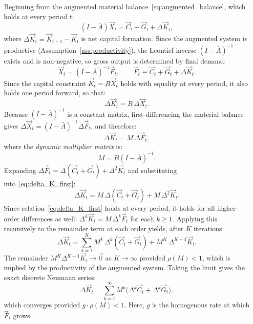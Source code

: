 Beginning from the augmented material balance~\eqref{eq:augmented_balance},
which holds at every period $t$:
%
\begin{equation}
    (I - \bar{A})\vec{X}_{t} = \vec{C}_{t} + \vec{G}_{t} + \Delta\vec{K}_{t},
\end{equation}
%
where $\Delta\vec{K}_{t} = \vec{K}_{t+1} - \vec{K}_{t}$ is net capital
formation. Since the augmented system is productive
(Assumption~\ref{ass:productivity}), the Leontief inverse
$(I - \bar{A})^{-1}$ exists and is non-negative, so gross output is
determined by final demand:
%
\begin{equation}
    \vec{X}_{t} = (I - \bar{A})^{-1} \vec{F}_{t},
    \qquad
    \vec{F}_{t} \equiv \vec{C}_{t} + \vec{G}_{t} + \Delta\vec{K}_{t}.
\end{equation}
%
Since the capital constraint $\vec{K}_{t} = B\vec{X}_{t}$ holds with
equality at every period, it also holds one period forward, so that:
%
\begin{equation}
    \Delta\vec{K}_{t} = B\,\Delta\vec{X}_{t}.
\end{equation}
%
Because $(I - \bar{A})^{-1}$ is a constant matrix, first-differencing
the material balance gives $\Delta\vec{X}_{t} = (I-\bar{A})^{-1}
\Delta\vec{F}_{t}$, and therefore:
%
\begin{equation}\label{eq:delta_K_first}
    \Delta\vec{K}_{t} = M\,\Delta\vec{F}_{t},
\end{equation}
%
where the \emph{dynamic multiplier matrix} is:
%
\begin{equation}\label{eq:multiplier}
    M = B(I - \bar{A})^{-1}.
\end{equation}
%
Expanding $\Delta\vec{F}_{t} = \Delta(\vec{C}_{t} + \vec{G}_{t}) +
\Delta^{2}\vec{K}_{t}$ and substituting into~\eqref{eq:delta_K_first}:
%
\begin{equation}
    \Delta\vec{K}_{t}
    = M\,\Delta(\vec{C}_{t} + \vec{G}_{t})
    + M\,\Delta^{2}\vec{K}_{t}.
\end{equation}
%
Since relation~\eqref{eq:delta_K_first} holds at every period, it
holds for all higher-order differences as well:
$\Delta^{k}\vec{K}_{t} = M\,\Delta^{k}\vec{F}_{t}$ for each
$k \geq 1$. Applying this recursively to the remainder term at each
order yields, after $K$ iterations:
%
\begin{equation}
    \Delta\vec{K}_{t}
    = \sum_{k=1}^{K} M^{k}\,\Delta^{k}(\vec{C}_{t} + \vec{G}_{t})
    + M^{K}\,\Delta^{K+1}\vec{K}_{t}.
\end{equation}
%
The remainder $M^{K}\Delta^{K+1}\vec{K}_{t} \to \vec{0}$ as
$K\to\infty$ provided $\rho(M) < 1$, which is implied by the
productivity of the augmented system. Taking the limit gives the
exact discrete Neumann series:
%
\begin{equation}\label{eq:finite_difference}
\boxed{
    \Delta\vec{K}_{t}
    = \sum_{k=1}^{\infty} M^{k}
    \bigl(\Delta^{k}\vec{C}_{t} + \Delta^{k}\vec{G}_{t}\bigr),}
\end{equation}
%
which converges provided $g \cdot \rho(M) < 1$. Here, $g$ is the homogenous rate at which $\vec{F}_t$ grows.

